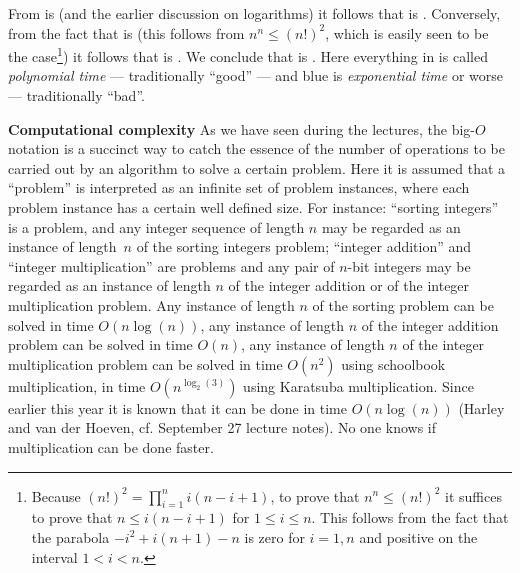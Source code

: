 \documentclass[titlepage]{article}
\theoremstyle{definition}
\numberwithin{equation}{subsection}
\numberwithin{remark}{subsection}
\begin{document}
From {\color{blue}{$n!$}} is {\color{blue}{$O(n^n)$}} (and the earlier discussion on logarithms) it follows that {\color{purple}{$\log(n!)$}} is {\color{purple}{$O(\log(n^n))=O(n\log(n))$}}. Conversely, from the fact that {\color{blue}{$n^n$}} is {\color{blue}{$O((n!)^2)$}} (this follows from $n^n\le(n!)^2$, which is easily seen to be the case\footnote{
Because $(n!)^2=\prod_{i=1}^ni(n-i+1)$, to prove that $n^n\le(n!)^2$ it suffices to prove that $n\le i(n-i+1)$ for $1\le i\le n$. This follows from the fact that the parabola $-i^2+i(n+1)-n$ is zero for $i=1,n$ and positive on the interval $1<i<n$.
}) it follows that {\color{purple}{$\log(n^n)=n\log(n)$}} is {\color{purple}{$O(\log((n!)^2))=O(\log(n!))$}}. We conclude that  {\color{purple}{$n\log(n)$}} is {\color{purple}{$\Theta(\log(n!))$}}.
Here everything in {\color{purple}{purple}} is called \emph{polynomial time} --- traditionally ``good'' --- and blue is \emph{exponential time} or worse --- traditionally ``bad''.\\
\par\noindent
\vspace{2pt}
\par\noindent
{\bf{Computational complexity}}
As we have seen during the lectures, the big-$O$ notation is a succinct way to catch the essence of the number of operations to be carried out by an algorithm to solve a certain problem.
Here it is assumed that a ``problem'' is interpreted as an infinite set of problem instances, where each problem instance has a certain well defined size.
For instance: ``sorting integers'' is a problem, and any integer sequence of length $n$ may be regarded as an instance of length~$n$ of the sorting integers problem; ``integer addition'' and ``integer multiplication'' are problems and any pair of $n$-bit integers may be regarded as an instance of length $n$ of the integer addition or of the integer multiplication problem.
Any instance of length $n$ of the sorting problem can be solved in time $O(n\log(n))$, any instance of length $n$ of the integer addition problem can be solved in time $O(n)$, any instance of length $n$ of the integer multiplication problem can be solved in time $O(n^2)$ using schoolbook multiplication, in time $O(n^{\log_2(3)})$ using Karatsuba multiplication. Since earlier this year it is known that it can be done in time $O(n\log(n))$ (Harley and van der Hoeven, cf. September 27 lecture notes). No one knows if multiplication can be done faster. 
\end{document}
